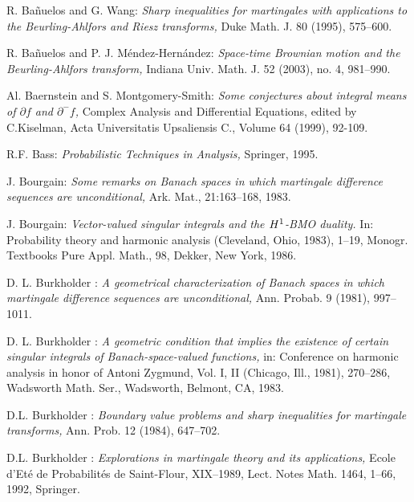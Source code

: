 \documentclass[11pt,a4paper,twoside,draft]{amsart}
\theoremstyle{definition}
\begin{document}

\begin{thebibliography}{1}

R. Ba\~nuelos and G. Wang: {\it Sharp inequalities for martingales 
with applications to the Beurling-Ahlfors and Riesz transforms,} 
Duke Math. J.  80  (1995),  575--600. 

R. Ba\~nuelos and P. J. M\'endez-Hern\'andez: {\it Space-time Brownian 
motion and the Beurling-Ahlfors transform,} 
Indiana Univ. Math. J.  52  (2003),  no. 4, 981--990. 

Al. Baernstein and S. Montgomery-Smith:
{\it Some conjectures about integral means of $\partial f$ and $\partial^-f$,}
Complex Analysis and Differential Equations, edited by C.Kiselman, 
Acta Universitatis Upsaliensis C., Volume 64 (1999), 92-109.

R.F. Bass:
{\em Probabilistic Techniques in Analysis,}
Springer, 1995.

J. Bourgain:
{\it Some remarks on {B}anach spaces in which martingale difference
sequences are unconditional,}
Ark. Mat., 21:163--168, 1983.

J. Bourgain: {\it Vector-valued singular integrals and the $H\sp 1$-BMO duality.} In:  Probability theory and harmonic analysis (Cleveland, Ohio, 1983),  1--19, Monogr. Textbooks Pure Appl. Math., 98, Dekker, New York, 1986.

D. L. Burkholder : { \it A geometrical characterization of Banach spaces in which martingale 
difference sequences are unconditional,}  
Ann. Probab.  9  (1981),  997--1011. 

D. L. Burkholder : {\it A geometric condition that implies the existence of certain 
singular integrals of Banach-space-valued functions,}
in: Conference on harmonic analysis in honor of Antoni Zygmund, Vol. I, II 
(Chicago, Ill., 1981),  270--286, Wadsworth Math. Ser., Wadsworth, Belmont, CA, 1983.

D.L. Burkholder : {\it Boundary value problems and sharp inequalities for 
                   martingale transforms,}
Ann. Prob. 12 (1984), 647--702. 

D.L. Burkholder : {\it Explorations in martingale theory and its applications,}
Ecole d'Et\'{e} de Probabilit\'{e}s de Saint-Flour, XIX--1989,
Lect. Notes Math.  1464, 1--66, 1992, Springer. 
    

\end{thebibliography}
\end{document}
